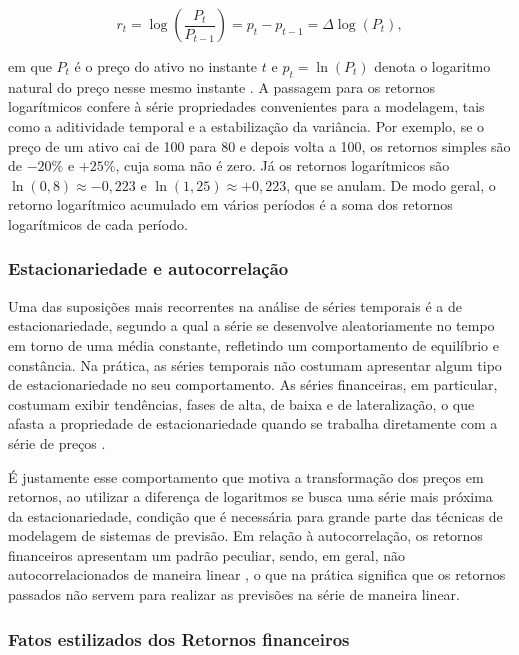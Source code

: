 \documentclass[
    12pt,                %
    openright,           %
    oneside,             %
    a4paper,             %
    english,             %
    brazil               %
]{abntex2}
\begin{document}
\begin{equation}
    r_t = \log\!\left(\frac{P_t}{P_{t-1}}\right) = p_t - p_{t-1} = \Delta \log(P_t),
    \label{retorno_logaritmico}
\end{equation}

em que $P_t$ é o preço do ativo no instante $t$ e $p_t = \ln(P_t)$ denota o logaritmo natural do preço nesse mesmo 
instante \cite{morettin2018analise}. A passagem para os retornos logarítmicos confere à série propriedades 
convenientes para a modelagem, tais como a aditividade temporal e a estabilização da variância. Por exemplo, se o 
preço de um ativo cai de 100 para 80 e depois volta a 100, os retornos simples são de $-20\%$ e $+25\%$, cuja soma não é zero. 
Já os retornos logarítmicos são $\ln(0{,}8) \approx -0{,}223$ e $\ln(1{,}25) \approx +0{,}223$, que se anulam. 
De modo geral, o retorno logarítmico acumulado em vários períodos é a soma dos retornos logarítmicos de cada período.

\subsubsection{Estacionariedade e autocorrelação}
\label{subsubsec:estacionariedade}

Uma das suposições mais recorrentes na análise de séries temporais é a de estacionariedade, segundo a qual a série se desenvolve aleatoriamente no tempo em torno de uma média constante, refletindo um comportamento de equilíbrio e constância. Na prática, as séries temporais não costumam apresentar algum tipo de estacionariedade no seu comportamento. As séries financeiras, em particular, costumam exibir tendências, fases de alta, de baixa e de lateralização, o que afasta a propriedade de estacionariedade quando se trabalha diretamente com a série de preços \cite{morettin2018analise}.

É justamente esse comportamento que motiva a transformação dos preços em retornos, ao utilizar a diferença de logaritmos se busca uma série mais próxima da estacionariedade, condição que é necessária para grande parte das técnicas de modelagem de sistemas de previsão. Em relação à autocorrelação, os retornos financeiros apresentam um padrão peculiar, sendo, em geral, não autocorrelacionados de maneira linear \cite{morettin2018analise}, o que na prática significa que os retornos passados não servem para realizar as previsões na série de maneira linear.

\subsubsection{Fatos estilizados dos Retornos financeiros}
\label{fatos_estilizados}
\end{document}
